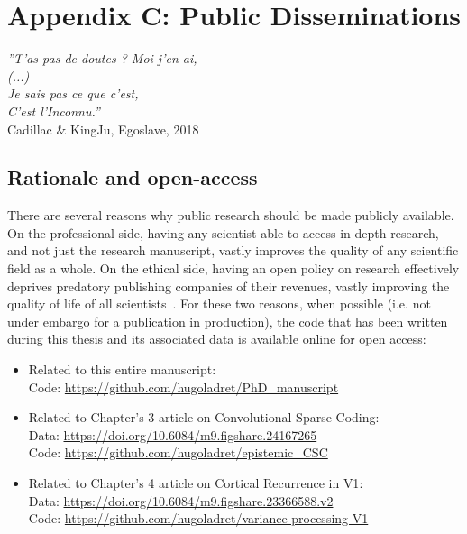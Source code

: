 \section{Appendix C: Public Disseminations} 
\begin{flushright}
    \textit{''T'as pas de doutes ? Moi j'en ai,\\
    (...)\\
    Je sais pas ce que c'est, \\
    C'est l'Inconnu.''}\\
    Cadillac \& KingJu, Egoslave, 2018
\end{flushright}
\label{appendix_public_articles}

\subsection{Rationale and open-access}

There are several reasons why public research should be made publicly available. On the professional side, having any scientist able to access in-depth research, and not just the research manuscript, vastly improves the quality of any scientific field as a whole. On the ethical side, having an open policy on research effectively deprives predatory publishing companies of their revenues, vastly improving the quality of life of all scientists~\cite{smith2023imaging}. For these two reasons, when possible (i.e. not under embargo for a publication in production), the code that has been written during this thesis and its associated data is available online for open access:
\begin{itemize}
    \item Related to this entire manuscript: \\
    Code: \href{https://github.com/hugoladret/PhD_manuscript}{\url{https://github.com/hugoladret/PhD_manuscript}}
    \item Related to Chapter's 3 article on Convolutional Sparse Coding: \\
    Data: \href{https://doi.org/10.6084/m9.figshare.24167265}{\url{https://doi.org/10.6084/m9.figshare.24167265}} \\
    Code: \href{https://github.com/hugoladret/epistemic_CSC}{\url{https://github.com/hugoladret/epistemic_CSC}}
    \item Related to Chapter's 4 article on Cortical Recurrence in \gls{V1}: \\
    Data: \href{https://doi.org/10.6084/m9.figshare.23366588.v2}{\url{https://doi.org/10.6084/m9.figshare.23366588.v2}} \\
    Code: \href{https://github.com/hugoladret/variance-processing-V1}{\url{https://github.com/hugoladret/variance-processing-V1}}
\end{itemize}

